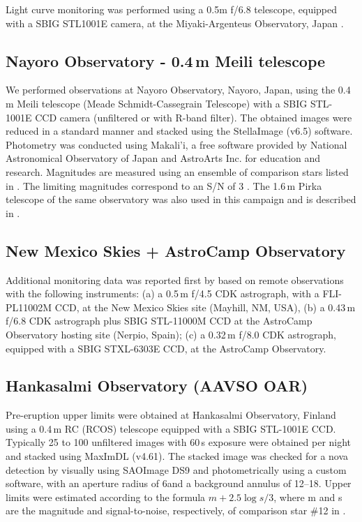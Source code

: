 \documentclass[twocolumn,tighten]{aastex6}
\newcommand{\othreek}{\citetalias{2016ApJ...833..149D}}
\begin{document}
Light curve monitoring was performed using a 0.5m f/6.8 telescope, equipped with a SBIG STL1001E camera, at the Miyaki-Argenteus Observatory, Japan \citep{2016ATel.9891....1N}.

\subsection{Nayoro Observatory - 0.4\,m Meili telescope}

We performed observations at Nayoro Observatory, Nayoro, Japan, using the 0.4\,m Meili telescope (Meade Schmidt-Cassegrain Telescope) with a SBIG STL-1001E CCD camera (unfiltered or with R-band filter). The obtained images were reduced in a standard manner and stacked using the StellaImage (v6.5) software. Photometry was conducted using Makali'i, a free software provided by National Astronomical Observatory of Japan and AstroArts Inc. for education and research. Magnitudes are measured using an ensemble of comparison stars listed in \othreek. The limiting magnitudes correspond to an S/N of 3 \citep{2016ATel.9891....1N}. The 1.6\,m Pirka telescope of the same observatory was also used in this campaign and is described in \othreek.

\subsection{New Mexico Skies + AstroCamp Observatory}

Additional monitoring data was reported first by \citep{2016ATel.9891....1N} based on remote observations with the following instruments: (a) a 0.5\,m f/4.5 CDK astrograph, with a FLI-PL11002M CCD, at the New Mexico Skies site (Mayhill, NM, USA), (b) a 0.43\,m f/6.8 CDK astrograph plus SBIG STL-11000M CCD at the AstroCamp Observatory hosting site (Nerpio, Spain); (c) a 0.32\,m f/8.0 CDK astrograph, equipped with a SBIG STXL-6303E CCD, at the AstroCamp Observatory.

\subsection{Hankasalmi Observatory (AAVSO OAR)}

Pre-eruption upper limits were obtained at Hankasalmi Observatory, Finland using a 0.4\,m RC (RCOS) telescope equipped with a SBIG STL-1001E CCD. Typically 25 to 100 unfiltered images with 60\,s exposure were obtained per night and stacked using MaxImDL (v4.61). The stacked image was checked for a nova detection by visually using SAOImage DS9 and photometrically using a custom software, with an aperture radius of 6\arcsec and a background annulus of 12\arcsec--18\arcsec. Upper limits were estimated according to the formula $m + 2.5 \log{s}/3$, where m and s are the magnitude and signal-to-noise, respectively, of comparison star \#12 in \othreek.
\end{document}
